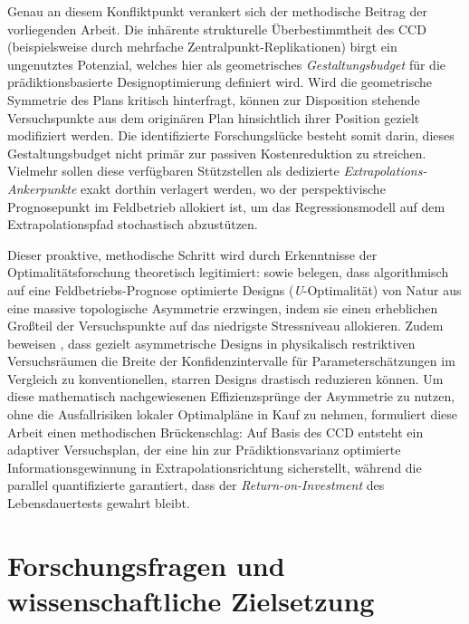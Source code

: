 Genau an diesem Konfliktpunkt verankert sich der methodische Beitrag der vorliegenden Arbeit.
Die inhärente strukturelle Überbestimmtheit des \ac{CCD} (beispielsweise durch mehrfache Zentralpunkt-Replikationen) birgt ein ungenutztes Potenzial, welches hier als geometrisches \textit{Gestaltungsbudget} für die prädiktionsbasierte Designoptimierung definiert wird.
Wird die geometrische Symmetrie des Plans kritisch hinterfragt, können zur Disposition stehende Versuchspunkte aus dem originären Plan hinsichtlich ihrer Position gezielt modifiziert werden.
Die identifizierte Forschungslücke besteht somit darin, dieses Gestaltungsbudget nicht primär zur passiven Kostenreduktion zu streichen.
Vielmehr sollen diese verfügbaren Stützstellen als dedizierte \textit{Extrapolations-Ankerpunkte} exakt dorthin verlagert werden, wo der perspektivische Prognosepunkt im Feldbetrieb allokiert ist, um das Regressionsmodell auf dem Extrapolationspfad stochastisch abzustützen.

Dieser proaktive, methodische Schritt wird durch Erkenntnisse der Optimalitätsforschung theoretisch legitimiert: \textcite{Seo.2015} sowie \textcite{Monroe.2010} belegen, dass algorithmisch auf eine Feldbetriebs-Prognose optimierte Designs (\textit{U}-Optimalität) von Natur aus eine massive topologische Asymmetrie erzwingen, indem sie einen erheblichen Großteil der Versuchspunkte auf das niedrigste Stressniveau allokieren.
Zudem beweisen \textcite{Monroe.2008}, dass gezielt asymmetrische Designs in physikalisch restriktiven Versuchsräumen die Breite der Konfidenzintervalle für Parameterschätzungen im Vergleich zu konventionellen, starren Designs drastisch reduzieren können.
Um diese mathematisch nachgewiesenen Effizienzsprünge der Asymmetrie zu nutzen, ohne die Ausfallrisiken lokaler Optimalpläne in Kauf zu nehmen, formuliert diese Arbeit einen methodischen Brückenschlag:
Auf Basis des \ac{CCD} entsteht ein adaptiver Versuchsplan, der eine hin zur Prädiktionsvarianz optimierte Informationsgewinnung in Extrapolationsrichtung sicherstellt, während die parallel quantifizierte  garantiert, dass der \textit{Return-on-Investment} des Lebensdauertests gewahrt bleibt.

\section{Forschungsfragen und wissenschaftliche Zielsetzung} \label{sec:forschungsfragen}

